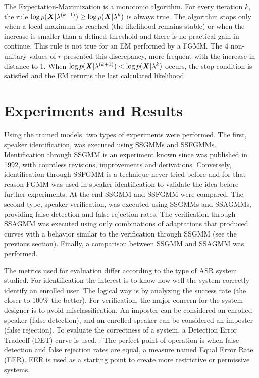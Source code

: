 The Expectation-Maximization is a monotonic algorithm. For every iteration $k$, the rule $\log p(\boldsymbol{X}|\lambda^{(k+1)}) \geq \log p(\boldsymbol{X}|\lambda^{k})$ is always true. The algorithm stops only when a local maximum is reached (the likelihood remains stable) or when the increase is smaller than a defined threshold and there is no practical gain in continue. This rule is not true for an EM performed by a FGMM. The 4 non-unitary values of $r$ presented this discrepancy, more frequent with the increase in distance to 1. When $\log p(\boldsymbol{X}|\lambda^{(k+1)}) < \log p(\boldsymbol{X}|\lambda^{k})$ occurs, the stop condition is satisfied and the EM returns the last calculated likelihood.

\section{Experiments and Results}
\label{sec:experiments-and-results}

Using the trained models, two types of experiments were performed. The first, speaker identification, was executed using SSGMMs and SSFGMMs. Identification through SSGMM is an experiment known since  was published in 1992, with countless revisions, improvements and derivations. Conversely, identification through SSFGMM is a technique never tried before and for that reason FGMM was used in speaker identification to validate the idea before further experiments. At the end SSGMM and SSFGMM were compared. The second type, speaker verification, was executed using SSGMMs and SSAGMMs, providing false detection and false rejection rates. The verification through SSAGMM was executed using only combinations of adaptations that produced curves with a behavior similar to the verification through SSGMM (see the previous section). Finally, a comparison between SSGMM and SSAGMM was performed.

The metrics used for evaluation differ according to the type of ASR system studied. For identification the interest is to know how well the system correctly identify an enrolled user. The logical way is by analyzing the success rate (the closer to 100\% the better). For verification, the major concern for the system designer is to avoid misclassification. An imposter can be considered an enrolled speaker (false detection), and an enrolled speaker can be considered an imposter (false rejection). To evaluate the correctness of a system, a Detection Error Tradeoff (DET) curve is used, . The perfect point of operation is when false detection and false rejection rates are equal, a measure named Equal Error Rate (EER). EER is used as a starting point to create more restrictive or permissive systems.

